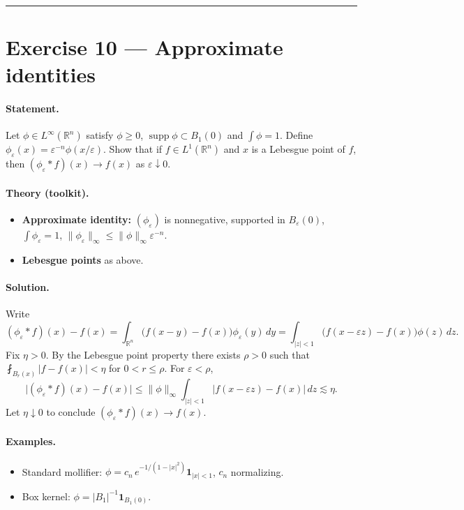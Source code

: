 \documentclass[12pt,a4paper]{article}
\theoremstyle{plain}
\theoremstyle{definition}
\theoremstyle{remark}
\theoremstyle{remark}
\theoremstyle{definition}
\begin{document}
\bigskip\hrule\bigskip

\section*{Exercise 10 — Approximate identities}

\paragraph{Statement.}
Let $\phi\in L^\infty(\mathbb{R}^n)$ satisfy $\phi\ge0$, $\operatorname{supp}\phi\subset B_1(0)$ and $\int\phi=1$.
Define $\phi_\varepsilon(x)=\varepsilon^{-n}\phi(x/\varepsilon)$. Show that if $f\in L^1(\mathbb{R}^n)$ and $x$ is a
Lebesgue point of $f$, then $(\phi_\varepsilon * f)(x)\to f(x)$ as $\varepsilon\downarrow0$.

\paragraph{Theory (toolkit).}
\begin{itemize}\itemsep3pt
	\item \textbf{Approximate identity:} $(\phi_\varepsilon)$ is nonnegative, supported in $B_\varepsilon(0)$,
	$\int\phi_\varepsilon=1$, $\|\phi_\varepsilon\|_\infty\le \|\phi\|_\infty \varepsilon^{-n}$.
	\item \textbf{Lebesgue points} as above.
\end{itemize}

\paragraph{Solution.}
Write
\[
(\phi_\varepsilon*f)(x)-f(x)
=\int_{\mathbb{R}^n}\!\bigl(f(x-y)-f(x)\bigr)\phi_\varepsilon(y)\,dy
=\int_{|z|<1}\!\bigl(f(x-\varepsilon z)-f(x)\bigr)\phi(z)\,dz.
\]
Fix $\eta>0$. By the Lebesgue point property there exists $\rho>0$ such that
$\fint_{B_r(x)}|f-f(x)|<\eta$ for $0<r\le\rho$. For $\varepsilon<\rho$,
\[
\big|(\phi_\varepsilon*f)(x)-f(x)\big|
\le \|\phi\|_\infty \int_{|z|<1}\!|f(x-\varepsilon z)-f(x)|\,dz
\lesssim \eta.
\]
Let $\eta\downarrow0$ to conclude $(\phi_\varepsilon*f)(x)\to f(x)$.

\paragraph{Examples.}
\begin{itemize}\itemsep2pt
	\item Standard mollifier: $\phi=c_n\,e^{-1/(1-|x|^2)}\mathbf 1_{|x|<1}$, $c_n$ normalizing.
	\item Box kernel: $\phi=|B_1|^{-1}\mathbf 1_{B_1(0)}$.
\end{itemize}
\end{document}
